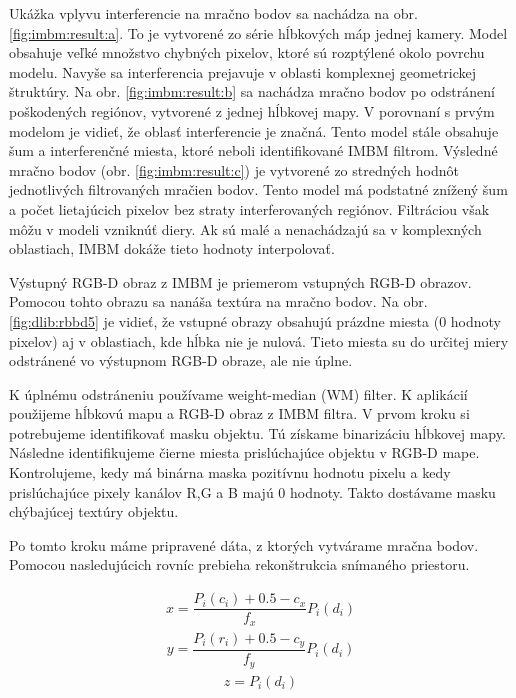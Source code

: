 Ukážka vplyvu interferencie na mračno bodov sa nachádza na obr. \ref{fig:imbm:result:a}. To je vytvorené zo série hĺbkových máp jednej kamery. Model obsahuje veľké množstvo chybných pixelov, ktoré sú rozptýlené okolo povrchu modelu. Navyše sa interferencia prejavuje v oblasti komplexnej geometrickej štruktúry. 
Na obr. \ref{fig:imbm:result:b} sa nachádza mračno bodov po odstránení poškodených regiónov, vytvorené z jednej hĺbkovej mapy. V porovnaní s prvým modelom je vidieť, že oblasť interferencie je značná. Tento model stále obsahuje šum a interferenčné miesta, ktoré neboli identifikované IMBM filtrom.  
Výsledné mračno bodov (obr. \ref{fig:imbm:result:c}) je vytvorené zo stredných hodnôt jednotlivých filtrovaných mračien bodov. Tento model má podstatné znížený šum a počet lietajúcich pixelov bez straty interferovaných regiónov. Filtráciou však môžu v modeli vzniknúť diery. Ak sú malé a nenachádzajú sa v komplexných oblastiach, IMBM dokáže tieto hodnoty interpolovať. 

Výstupný RGB-D obraz z IMBM je priemerom vstupných RGB-D obrazov. Pomocou tohto obrazu sa nanáša textúra na mračno bodov. Na obr. \ref{fig:dlib:rbbd5} je vidieť, že vstupné obrazy obsahujú prázdne miesta (0 hodnoty pixelov) aj v oblastiach, kde hĺbka nie je nulová.
Tieto miesta su do určitej miery odstránené vo výstupnom RGB-D obraze, ale nie úplne.

K úplnému odstráneniu používame weight-median (WM) filter. K aplikácií použijeme hĺbkovú mapu a RGB-D obraz z IMBM filtra. 
V prvom kroku si potrebujeme identifikovať masku objektu. Tú získame binarizáciu hĺbkovej mapy. Následne identifikujeme čierne miesta prislúchajúce objektu v RGB-D mape. Kontrolujeme, kedy má binárna maska pozitívnu hodnotu pixelu a kedy prislúchajúce pixely kanálov R,G a B majú 0 hodnoty. Takto dostávame masku chýbajúcej textúry objektu.  


Po tomto kroku máme pripravené dáta, z ktorých vytvárame mračna bodov. Pomocou nasledujúcich rovníc prebieha rekonštrukcia snímaného priestoru. 

\begin{equation}
\label{eq:project:x}
\begin{aligned}
x=\dfrac{P_{i}(c_{i})+0.5-c_{x}}{f_{x}}P_{i}(d_{i})
\end{aligned}
\end{equation}
\begin{equation}
\label{key}
\begin{aligned}
y=\dfrac{P_{i}(r_{i})+0.5-c_{y}}{f_{y}}P_{i}(d_{i})
\end{aligned}
\end{equation}
\begin{equation}
\label{key}
\begin{aligned}
z=P_{i}(d_{i})
\end{aligned}
\end{equation}

